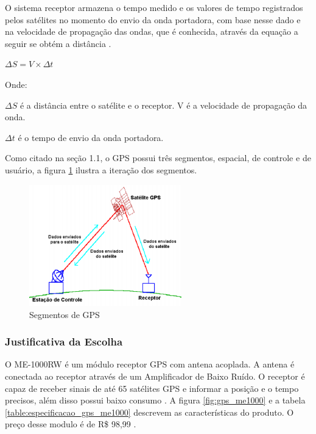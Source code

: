 O sistema receptor armazena o tempo medido e os valores de tempo registrados
pelos satélites no momento do envio da onda portadora, com base nesse dado e
 na velocidade de propagação das ondas, que é conhecida, através da equação
 a seguir se obtém a distância \cite{8gps}.

 $ \Delta S = V \times  \Delta t $

 Onde:

 $ \Delta S $ é a distância entre o satélite e o receptor.
V é a velocidade de propagação da onda.

$ \Delta t $ é o tempo de envio da onda portadora.

Como citado na seção 1.1, o GPS possui três segmentos, espacial, de controle e
de usuário, a figura \ref{fig:segmentos_gps} ilustra a iteração dos segmentos.


\begin{figure}[h]
  \centering
  \includegraphics[width=250px, scale=1]{figuras/segmentos_gps}
  \caption{Segmentos de GPS  \cite{9gps}}
\label{fig:segmentos_gps}
\end{figure}


\subsubsection{Justificativa da Escolha}


  O ME-1000RW é um módulo receptor GPS com antena acoplada. A antena é conectada
  ao receptor através de um Amplificador de Baixo Ruído. O receptor é capaz de
  receber sinais de até 65 satélites GPS e informar a posição e o tempo precisos,
  além disso possui baixo consumo \cite{11gps}. A figura \ref{fig:gps_me1000} e a tabela
  \ref{table:especificacao_gps_me1000}
  descrevem as  características do produto. O preço desse modulo é de R\$ 98,99 \cite{12gps}.


